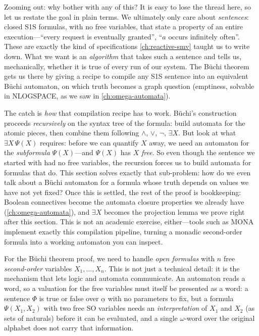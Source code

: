 \begin{intermezzo}{Zooming out: why bother with any of this?}
It is easy to lose the thread here, so let us restate the goal in plain
terms. We ultimately only care about \emph{sentences}: closed S1S
formulas, with no free variables, that state a property of an entire
execution---``every request is eventually granted'', ``$a$ occurs
infinitely often''. These are exactly the kind of specifications
\cref{ch:reactive-smv} taught us to write down. What we want is an
\emph{algorithm} that takes such a sentence and tells us, mechanically,
whether it is true of every run of our system. The Büchi theorem gets us
there by giving a recipe to compile any S1S sentence into an equivalent
Büchi automaton, on which truth becomes a graph question (emptiness,
solvable in NLOGSPACE, as we saw in \cref{ch:omega-automata}).

The catch is \emph{how} that compilation recipe has to work. Büchi's
construction proceeds \emph{recursively} on the syntax tree of the
formula: build automata for the atomic pieces, then combine them
following $\land$, $\lor$, $\neg$, $\exists X$. But look at what
$\exists X\,\Psi(X)$ requires: before we can quantify $X$ away, we need
an automaton for the \emph{subformula} $\Psi(X)$---and $\Psi(X)$ has $X$
\emph{free}. So even though the sentence we started with had no free
variables, the recursion forces us to build automata for formulas that
do. This section solves exactly that sub-problem: how do we even talk
about a Büchi automaton for a formula whose truth depends on values we
have not yet fixed? Once this is settled, the rest of the proof is
bookkeeping: Boolean connectives become the automata closure properties
we already have (\cref{ch:omega-automata}), and $\exists X$ becomes the
projection lemma we prove right after this section. This is not an
academic exercise, either---tools such as MONA implement exactly this
compilation pipeline, turning a monadic second-order formula into a
working automaton you can inspect.
\end{intermezzo}

For the Büchi theorem proof, we need to handle \emph{open formulas} with
$n$ free \emph{second-order} variables $X_1, \ldots, X_n$.
This is not just a technical detail: it is the mechanism that lets logic
and automata communicate.  An automaton reads a word, so a valuation for the
free variables must itself be presented as a word: a sentence $\Phi$ is
true or false over $\underline{\alpha}$ with no parameters to fix, but a
formula $\Psi(X_1, X_2)$ with two free SO variables needs an
\emph{interpretation} of $X_1$ and $X_2$ (as sets of naturals) before it
can be evaluated, and a single $\omega$-word over the original alphabet
does not carry that information.

